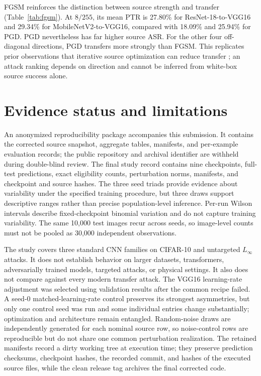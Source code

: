 \documentclass[10pt]{article}
\begin{document}
FGSM reinforces the distinction between source strength and transfer (Table~\ref{tab:fgsm}). At $8/255$, its mean PTR is 27.80\% for ResNet-18-to-VGG16 and 29.34\% for MobileNetV2-to-VGG16, compared with 18.09\% and 25.94\% for PGD. PGD nevertheless has far higher source ASR. For the other four off-diagonal directions, PGD transfers more strongly than FGSM. This replicates prior observations that iterative source optimization can reduce transfer \citep{dong}; an attack ranking depends on direction and cannot be inferred from white-box source success alone.

\section{Evidence status and limitations}
An anonymized reproducibility package accompanies this submission. It contains the corrected source snapshot, aggregate tables, manifests, and per-example evaluation records; the public repository and archival identifier are withheld during double-blind review. The final study record contains nine checkpoints, full-test predictions, exact eligibility counts, perturbation norms, manifests, and checkpoint and source hashes. The three seed triads provide evidence about variability under the specified training procedure, but three draws support descriptive ranges rather than precise population-level inference. Per-run Wilson intervals describe fixed-checkpoint binomial variation and do not capture training variability. The same 10,000 test images recur across seeds, so image-level counts must not be pooled as 30,000 independent observations.

The study covers three standard CNN families on CIFAR-10 and untargeted $L_\infty$ attacks. It does not establish behavior on larger datasets, transformers, adversarially trained models, targeted attacks, or physical settings. It also does not compare against every modern transfer attack. The VGG16 learning-rate adjustment was selected using validation results after the common recipe failed. A seed-0 matched-learning-rate control preserves its strongest asymmetries, but only one control seed was run and some individual entries change substantially; optimization and architecture remain entangled. Random-noise draws are independently generated for each nominal source row, so noise-control rows are reproducible but do not share one common perturbation realization. The retained manifests record a dirty working tree at execution time; they preserve prediction checksums, checkpoint hashes, the recorded commit, and hashes of the executed source files, while the clean release tag archives the final corrected code.
\end{document}
